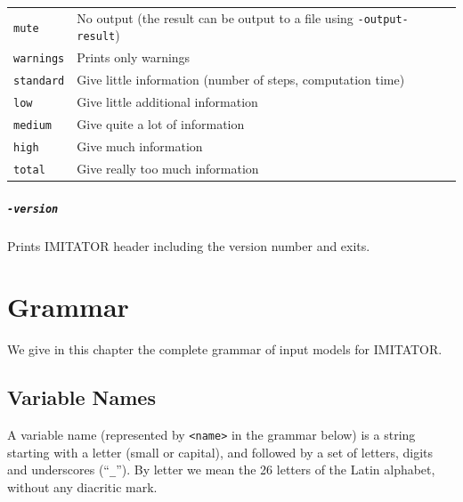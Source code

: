 \documentclass[a4paper,11pt]{report}
\newcommand{\imitator}{\textsf{IMITATOR}}
\newcommand{\styleIMI}[1]{\textcolor{imicolor}{\texttt{#1}}}
\newcommand{\styleOption}[1]{\textcolor{optioncolor}{\texttt{#1}}}
\begin{document}
\begin{tabular}{@{} l @{\ \ } l}
 \styleOption{mute} & No output (the result can be output to a file using \styleOption{-output-result}) \\
 \styleOption{warnings} & Prints only warnings \\
 \styleOption{standard} & Give little information (number of steps, computation time)\\
 \styleOption{low} & Give little additional information\\
 \styleOption{medium} & Give quite a lot of information\\
 \styleOption{high} & Give much information\\
 \styleOption{total} & Give really too much information\\
\end{tabular}


\paragraph{\styleOption{-version}}
Prints \imitator{} header including the version number and exits.



\chapter{Grammar}\label{chapter:grammar}


We give in this chapter the complete grammar of input models for \imitator{}.

\section{Variable Names}

A variable name (represented by \styleIMI{<name>} in the grammar below) is a string starting with a letter (small or capital), and followed by a set of letters, digits and underscores (``\styleIMI{\_}'').
By letter we mean the 26 letters of the Latin alphabet, without any diacritic mark.
\end{document}
